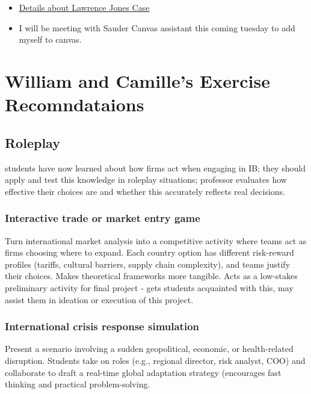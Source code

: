 \documentclass[
  11pt,
]{article}
\providecommand{\tightlist}{%
  \setlength{\itemsep}{0pt}\setlength{\parskip}{0pt}}
\begin{document}
\begin{itemize}
\tightlist
\item
  \href{https://www.youtube.com/watch?v=NJuogMaLva4}{Details about
  Lawrence Jones Case}
\item
  I will be meeting with Sauder Canvas assistant this coming tuesday to
  add myself to canvas.
\end{itemize}

\section{William and Camille's Exercise
Recomndataions}\label{william-and-camilles-exercise-recomndataions}

\subsection{Roleplay}\label{roleplay}

students have now learned about how firms act when engaging in IB; they
should apply and test this knowledge in roleplay situations; professor
evaluates how effective their choices are and whether this accurately
reflects real decisions.

\subsubsection{Interactive trade or market entry
game}\label{interactive-trade-or-market-entry-game}

Turn international market analysis into a competitive activity where
teams act as firms choosing where to expand. Each country option has
different risk-reward profiles (tariffs, cultural barriers, supply chain
complexity), and teams justify their choices. Makes theoretical
frameworks more tangible. Acts as a low-stakes preliminary activity for
final project - gets students acquainted with this, may assist them in
ideation or execution of this project.

\subsubsection{International crisis response
simulation}\label{international-crisis-response-simulation}

Present a scenario involving a sudden geopolitical, economic, or
health-related disruption. Students take on roles (e.g., regional
director, risk analyst, COO) and collaborate to draft a real-time global
adaptation strategy (encourages fast thinking and practical
problem-solving.
\end{document}
